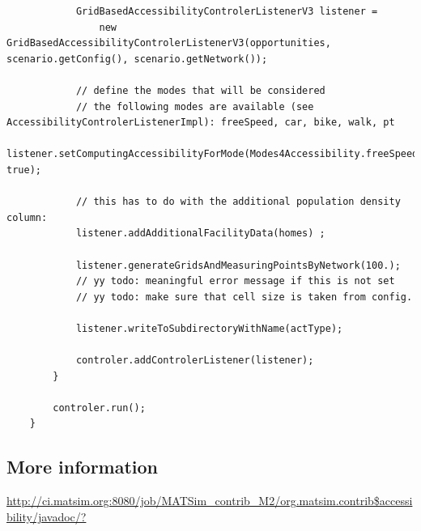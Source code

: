 \begin{lstlisting}
			GridBasedAccessibilityControlerListenerV3 listener = 
				new GridBasedAccessibilityControlerListenerV3(opportunities, scenario.getConfig(), scenario.getNetwork());

			// define the modes that will be considered
			// the following modes are available (see AccessibilityControlerListenerImpl): freeSpeed, car, bike, walk, pt
			listener.setComputingAccessibilityForMode(Modes4Accessibility.freeSpeed, true);

			// this has to do with the additional population density column:
			listener.addAdditionalFacilityData(homes) ;

			listener.generateGridsAndMeasuringPointsByNetwork(100.);
			// yy todo: meaningful error message if this is not set
			// yy todo: make sure that cell size is taken from config.
			
			listener.writeToSubdirectoryWithName(actType);
			
			controler.addControlerListener(listener);
		}
					
		controler.run();
	}
\end{lstlisting}

\subsection{More information}

\url{http://ci.matsim.org:8080/job/MATSim_contrib_M2/org.matsim.contrib$accessibility/javadoc/?}

%



